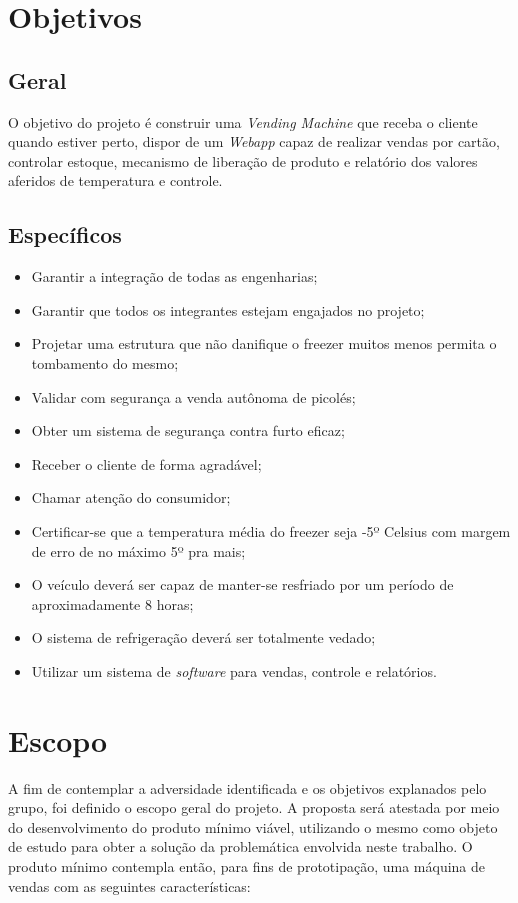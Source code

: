 \section{Objetivos}

\subsection{Geral}

O objetivo do projeto é construir uma \textit{Vending Machine} que receba o cliente quando estiver perto, dispor de um \textit{Webapp} capaz de realizar vendas por cartão, controlar estoque, mecanismo de liberação de produto e relatório dos valores aferidos de temperatura e controle.  

\subsection{Específicos}

\begin{itemize}
\item Garantir a integração de todas as engenharias;
\item Garantir que todos os integrantes estejam engajados no projeto;
\item Projetar uma estrutura que não danifique o freezer muitos menos permita o tombamento do mesmo;
\item Validar com segurança a venda autônoma de picolés;
\item Obter um sistema de segurança contra furto eficaz;
\item Receber o cliente de forma agradável;
\item Chamar atenção do consumidor;
\item Certificar-se que a temperatura média do freezer seja -5º Celsius com margem de erro de no máximo 5º pra mais;
\item O veículo deverá ser capaz de manter-se resfriado por um período de aproximadamente 8 horas;
\item O sistema de refrigeração deverá ser totalmente vedado;
\item Utilizar um sistema de \textit{software} para vendas, controle e relatórios.
\end{itemize}


\section{Escopo}
A fim de contemplar a adversidade identificada e os objetivos explanados pelo grupo, foi definido o escopo geral do projeto. A proposta será atestada por meio do desenvolvimento do produto mínimo viável, utilizando o mesmo como objeto de estudo para obter a solução da problemática envolvida neste trabalho. O produto mínimo contempla então, para fins de prototipação, uma máquina de vendas com as seguintes características:

